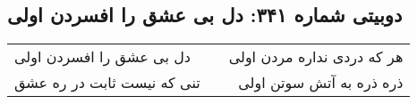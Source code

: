 \begin{center}
\section*{دوبیتی شماره ۳۴۱: دل بی عشق را افسردن اولی}
\label{sec:341}
\begin{longtable}{l p{0.5cm} r}
دل بی عشق را افسردن اولی
&&
هر که دردی نداره مردن اولی
\\
تنی که نیست ثابت در ره عشق
&&
ذره ذره به آتش سوتن اولی
\\
\end{longtable}
\end{center}
